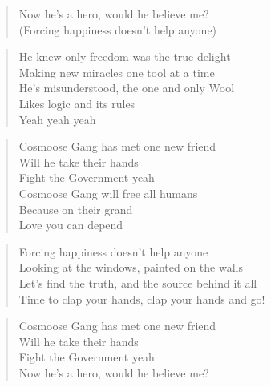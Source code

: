 \begin{minipage}{0.7\textwidth}
    \begin{verse}
    Now he's a hero, would he believe me? \\
    (Forcing happiness doesn't help anyone)
    \end{verse}

    \begin{verse}
    He knew only freedom was the true delight \\
    Making new miracles one tool at a time \\
    He's misunderstood, the one and only Wool \\
    Likes logic and its rules \\
    Yeah yeah yeah
    \end{verse}

    \begin{verse}
    Cosmoose Gang has met one new friend \\
    Will he take their hands \\
    Fight the Government yeah \\
    Cosmoose Gang will free all humans \\
    Because on their grand \\
    Love you can depend
    \end{verse}

    \begin{verse}
    Forcing happiness doesn't help anyone \\
    Looking at the windows, painted on the walls \\
    Let's find the truth, and the source behind it all \\
    Time to clap your hands, clap your hands and go!
    \end{verse}

    \begin{verse}
    Cosmoose Gang has met one new friend \\
    Will he take their hands \\
    Fight the Government yeah \\
    Now he's a hero, would he believe me?
    \end{verse}
\end{minipage}

\clearpage
